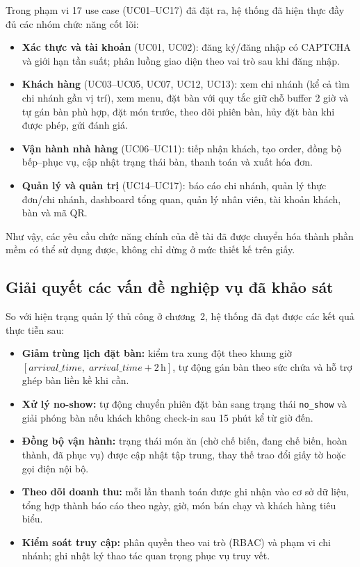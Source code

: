 \documentclass[../DoAn.tex]{subfiles}
\begin{document}
Trong phạm vi 17 use case (UC01--UC17) đã đặt ra, hệ thống đã hiện thực đầy đủ các nhóm chức năng cốt lõi:

\begin{itemize}
    \item \textbf{Xác thực và tài khoản} (UC01, UC02): đăng ký/đăng nhập có CAPTCHA và giới hạn tần suất; phân luồng giao diện theo vai trò sau khi đăng nhập.
    \item \textbf{Khách hàng} (UC03--UC05, UC07, UC12, UC13): xem chi nhánh (kể cả tìm chi nhánh gần vị trí), xem menu, đặt bàn với quy tắc giữ chỗ buffer 2 giờ và tự gán bàn phù hợp, đặt món trước, theo dõi phiên bàn, hủy đặt bàn khi được phép, gửi đánh giá.
    \item \textbf{Vận hành nhà hàng} (UC06--UC11): tiếp nhận khách, tạo order, đồng bộ bếp--phục vụ, cập nhật trạng thái bàn, thanh toán và xuất hóa đơn.
    \item \textbf{Quản lý và quản trị} (UC14--UC17): báo cáo chi nhánh, quản lý thực đơn/chi nhánh, dashboard tổng quan, quản lý nhân viên, tài khoản khách, bàn và mã QR.
\end{itemize}

Như vậy, các yêu cầu chức năng chính của đề tài đã được chuyển hóa thành phần mềm có thể sử dụng được, không chỉ dừng ở mức thiết kế trên giấy.

\subsection{Giải quyết các vấn đề nghiệp vụ đã khảo sát}

So với hiện trạng quản lý thủ công ở chương~2, hệ thống đã đạt được các kết quả thực tiễn sau:

\begin{itemize}
    \item \textbf{Giảm trùng lịch đặt bàn:} kiểm tra xung đột theo khung giờ $[\mathit{arrival\_time},\; \mathit{arrival\_time}+2\,\mathrm{h}]$, tự động gán bàn theo sức chứa và hỗ trợ ghép bàn liền kề khi cần.
    \item \textbf{Xử lý no-show:} tự động chuyển phiên đặt bàn sang trạng thái \texttt{no\_show} và giải phóng bàn nếu khách không check-in sau 15 phút kể từ giờ đến.
    \item \textbf{Đồng bộ vận hành:} trạng thái món ăn (chờ chế biến, đang chế biến, hoàn thành, đã phục vụ) được cập nhật tập trung, thay thế trao đổi giấy tờ hoặc gọi điện nội bộ.
    \item \textbf{Theo dõi doanh thu:} mỗi lần thanh toán được ghi nhận vào cơ sở dữ liệu, tổng hợp thành báo cáo theo ngày, giờ, món bán chạy và khách hàng tiêu biểu.
    \item \textbf{Kiểm soát truy cập:} phân quyền theo vai trò (RBAC) và phạm vi chi nhánh; ghi nhật ký thao tác quan trọng phục vụ truy vết.
\end{itemize}
\end{document}

